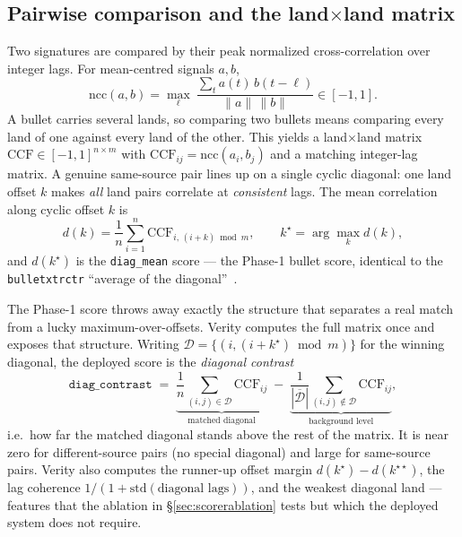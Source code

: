 \documentclass[11pt]{article}
\newcommand{\diagmean}{\texttt{diag\_mean}}
\newcommand{\diagcontrast}{\texttt{diag\_contrast}}
\newcommand{\code}[1]{\texttt{#1}}
\begin{document}
\subsection{Pairwise comparison and the land$\times$land matrix}
\label{sec:aggregate}
Two signatures are compared by their peak normalized cross-correlation over integer
lags. For mean-centred signals $a,b$,
\begin{equation}
  \mathrm{ncc}(a,b) = \max_{\ell}\
  \frac{\sum_t a(t)\,b(t-\ell)}{\lVert a\rVert\,\lVert b\rVert} \in [-1,1].
  \label{eq:ncc}
\end{equation}
A bullet carries several lands, so comparing two bullets means comparing every land
of one against every land of the other. This yields a land$\times$land matrix
$\mathrm{CCF}\in[-1,1]^{n\times m}$ with $\mathrm{CCF}_{ij}=\mathrm{ncc}(a_i,b_j)$
and a matching integer-lag matrix. A genuine same-source pair lines up on a single
cyclic diagonal: one land offset $k$ makes \emph{all} land pairs correlate at
\emph{consistent} lags. The mean correlation along cyclic offset $k$ is
\begin{equation}
  d(k) = \frac{1}{n}\sum_{i=1}^{n} \mathrm{CCF}_{i,\,(i+k)\bmod m},
  \qquad
  k^\star = \arg\max_k d(k),
  \label{eq:diag}
\end{equation}
and $d(k^\star)$ is the \diagmean{} score --- the Phase-1 bullet score, identical
to the \code{bulletxtrctr} ``average of the diagonal''~\cite{vanderplas2020}.

The Phase-1 score throws away exactly the structure that separates a real match
from a lucky maximum-over-offsets. Verity computes the full matrix once and exposes
that structure. Writing $\mathcal{D}=\{(i,(i+k^\star)\bmod m)\}$ for the winning
diagonal, the deployed score is the \emph{diagonal contrast}
\begin{equation}
  \diagcontrast \;=\; \underbrace{\frac{1}{n}\!\sum_{(i,j)\in\mathcal{D}}\!\mathrm{CCF}_{ij}}_{\text{matched diagonal}}
  \;-\;
  \underbrace{\frac{1}{|\overline{\mathcal{D}}|}\!\sum_{(i,j)\notin\mathcal{D}}\!\mathrm{CCF}_{ij}}_{\text{background level}},
  \label{eq:contrast}
\end{equation}
i.e.\ how far the matched diagonal stands above the rest of the matrix. It is near
zero for different-source pairs (no special diagonal) and large for same-source
pairs. Verity also computes the runner-up offset margin
$d(k^\star)-d(k^{\star\star})$, the lag coherence $1/(1+\mathrm{std}(\text{diagonal
lags}))$, and the weakest diagonal land --- features that the ablation in
\S\ref{sec:scorerablation} tests but which the deployed system does not require.
\end{document}

